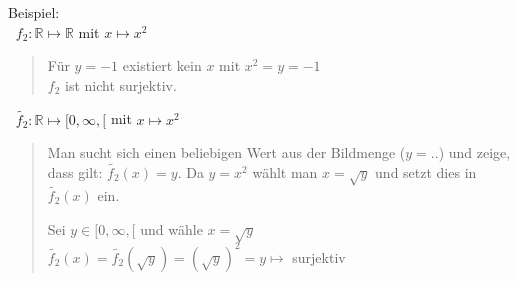 Beispiel:\\
\textbullet $\;\;f_2:\mathbb{R}\longmapsto\mathbb{R}$ mit $x\longmapsto x^2$\\
\begin{quote}
	Für $y=-1$ existiert kein $x$ mit $x^2=y=-1$\\
	$f_2$ ist nicht surjektiv.\vspace*{2mm}\\
\end{quote}
\pagebreak
\textbullet$\;\;\widetilde{f_2}: \mathbb{R}\longmapsto [0,\infty,[$ mit $x\longmapsto x^2$\\
\begin{quote}
	Man sucht sich einen beliebigen Wert aus der Bildmenge ($ y=.. $) und zeige, dass gilt: $ \widetilde{f_2}(x)=y $. Da $ y=x^2 $ wählt man $ x=\sqrt{y} $ und setzt dies in $ \widetilde{f_2}(x) $ ein.
	
	Sei $y\in [0,\infty,[$ und wähle $ x=\sqrt{y} $\\
	$\widetilde{f_2}(x)=\widetilde{f_2}(\sqrt{y})=(\sqrt{y})^2=y \mapsto$ surjektiv\\
	
\end{quote}

